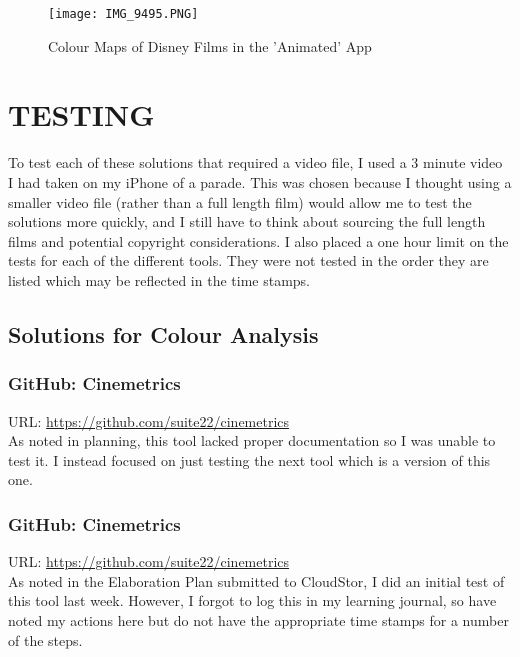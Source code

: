 \documentclass{article}
\begin{document}
\begin{figure}[htp]
    \centering
    \texttt{[image: IMG\_9495.PNG]}
    \caption{Colour Maps of Disney Films in the 'Animated' App}
    \label{fig:colourmaps}
\end{figure}

\pagebreak

\section{TESTING}

To test each of these solutions that required a video file, I used a 3 minute video I had taken on my iPhone of a parade. This was chosen because I thought using a smaller video file (rather than a full length film) would allow me to test the solutions more quickly, and I still have to think about sourcing the full length films and potential copyright considerations. I also placed a one hour limit on the tests for each of the different tools. They were not tested in the order they are listed which may be reflected in the time stamps.

\subsection{Solutions for Colour Analysis}

\subsubsection{GitHub: Cinemetrics}
URL: \url{https://github.com/suite22/cinemetrics}\\

As noted in planning, this tool lacked proper documentation so I was unable to test it. I instead focused on just testing the next tool which is a version of this one.

\subsubsection{GitHub: Cinemetrics}
URL: \url{https://github.com/suite22/cinemetrics}\\

As noted in the Elaboration Plan submitted to CloudStor, I did an initial test of this tool last week. However, I forgot to log this in my learning journal, so have noted my actions here but do not have the appropriate time stamps for a number of the steps.\\
\end{document}
